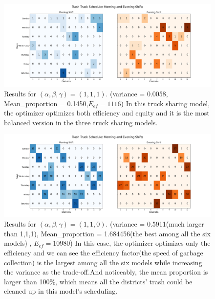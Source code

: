 \documentclass{article}
\begin{document}
\begin{figure}[H]
	\centering
	\includegraphics[width=1\textwidth]{figures/figures_shared/TGC TCT PGC sharing model.png}
	\caption{Results for $(\alpha, \beta,\gamma) = (1,1,1)$. (variance = 0.0058, Mean\_proportion = 0.1450,$E_{ef} = 1116$) In this truck sharing model, the optimizer optimizes both efficiency and equity and it is the most balanced version in the three truck sharing models.}
\end{figure}

\begin{figure}[H]
	\centering
	\includegraphics[width=1\textwidth]{figures/figures_shared/Prioritize TCT and TGC truck sharing.png}
	\caption{Results for $(\alpha,\beta,\gamma) = (1,1,0)$. (variance = 0.5911(much larger than 1,1,1), Mean\_proportion = 1.684456(the best among all the six models) , $E_{ef} = 10980$) In this case, the optimizer optimizes only the efficiency and we can see the efficiency factor(the speed of garbage collection) is the largest among all the six models while increasing the variance as the trade-off.And noticeably, the mean proportion is larger than 100\%, which means all the districts' trash could be cleaned up in this model's scheduling.}
\end{figure}
\end{document}
